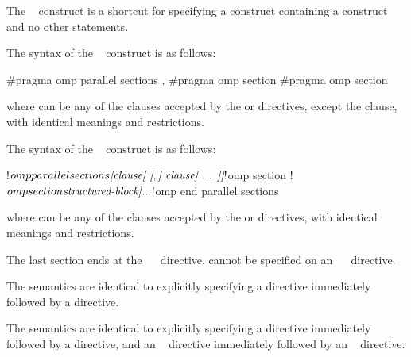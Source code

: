 \summary
The ~ construct is a shortcut for specifying a 
 construct containing a  construct and no other 
statements.

\syntax
\begin{ccppspecific}
The syntax of the ~ construct is as follows:

\begin{ompcPragma}
#pragma omp parallel sections \plc{[clause[ [},\plc{] clause] ... ] new-line}
    {
    \plc{[}#pragma omp section \plc{new-line]}
    \plc{[}#pragma omp section 
        \plc{structured-block]}
    }
\end{ompcPragma}

where  can be any of the clauses accepted by the  
or  directives, except the  clause, with identical 
meanings and restrictions.
\end{ccppspecific}

\begin{fortranspecific}
The syntax of the ~ construct is as follows:

\begin{ompfPragma}
!$omp parallel sections \plc{[clause[ [},\plc{] clause] ... ]}
    \plc{[}!$omp section\plc{]}
    \plc{[}!$omp section
        \plc{structured-block]}
    \plc{...}
!$omp end parallel sections
\end{ompfPragma}

where  can be any of the clauses accepted by the  
or  directives, with identical meanings and restrictions.

The last section ends at the ~~ directive. 
 cannot be specified on an ~~ 
directive.
\end{fortranspecific}

\descr
\begin{ccppspecific}
The semantics are identical to explicitly specifying a  directive 
immediately followed by a  directive.
\end{ccppspecific}

\begin{fortranspecific}
The semantics are identical to explicitly specifying a  directive 
immediately followed by a  directive, and an ~
directive immediately followed by an ~ directive.
\end{fortranspecific}

